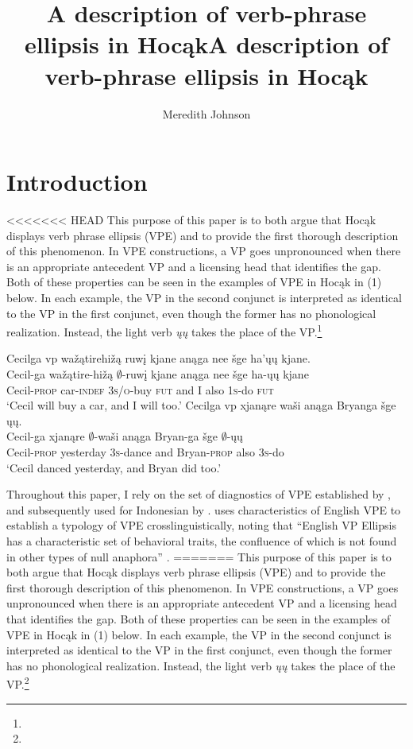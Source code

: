 \documentclass[output=paper]{LSP/langsci}
\author{Meredith Johnson}
\title{A description of verb-phrase ellipsis in Hocąk}
\title{A description of verb-phrase ellipsis in Hoc\k{a}k}
\begin{document}
\section{Introduction}

<<<<<<< HEAD
This purpose of this paper is to both argue that Hocąk displays verb phrase ellipsis (VPE) and to provide the first thorough description of this phenomenon. In VPE constructions, a VP goes unpronounced when there is an appropriate antecedent VP and a licensing head that identifies the gap. Both of these properties can be seen in the examples of VPE in Hocąk in (1) below. In each example, the VP in the second conjunct is interpreted as identical to the VP in the first conjunct, even though the former has no phonological realization. Instead, the light verb \emph{ųų} takes the place of the VP.\footnote{}


\ea
\ea
\glll Cecilga {\ob}{vp} wažątirehižą ruwį{\cb} kjane anąga nee šge {\ob}ha'ųų{\cb} kjane.\\
Cecil-ga {} wažątire-hižą {$\emptyset$}-ruwį kjane anąga nee šge ha-ųų kjane\\
Cecil-\textsc{prop} {} car-\textsc{indef} \textsc{3s/o}-buy \textsc{fut} and I also \textsc{1s}-do \textsc{fut}\\
\trans `Cecil will buy a car, and I will too.' 
\ex
\glll Cecilga {\ob}{vp} xjanąre waši{\cb} anąga Bryanga šge {\ob}ųų{\cb}.\\
Cecil-ga {} xjanąre {$\emptyset$}-waši anąga Bryan-ga šge {$\emptyset$}-ųų\\
Cecil-\textsc{prop} {} yesterday \textsc{3s}-dance and Bryan-\textsc{prop} also \textsc{3s}-do\\
\trans `Cecil danced yesterday, and Bryan did too.'
\z
\z

Throughout this paper, I rely on the set of diagnostics of VPE established by \citet{Goldberg2005}, and subsequently used for Indonesian by \citet{Fortin2007}. \citet{Goldberg2005} uses characteristics of English VPE to establish a typology of VPE crosslinguistically, noting that ``English VP Ellipsis has a characteristic set of behavioral traits, the confluence of which is not found in other types of null anaphora'' \citep[27]{Goldberg2005}. 
=======
This purpose of this paper is to both argue that Hoc\k{a}k displays verb phrase ellipsis (VPE) and to provide the first thorough description of this phenomenon. In VPE constructions, a VP goes unpronounced when there is an appropriate antecedent VP and a licensing head that identifies the gap. Both of these properties can be seen in the examples of VPE in Hoc\k{a}k in (1) below. In each example, the VP in the second conjunct is interpreted as identical to the VP in the first conjunct, even though the former has no phonological realization. Instead, the light verb \emph{\k{u}\k{u}} takes the place of the VP.\footnote{}
\end{document}
